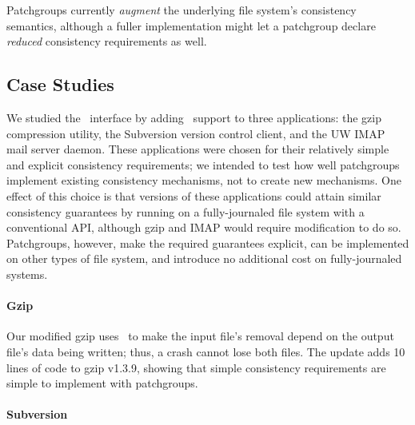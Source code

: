 Patchgroups currently \emph{augment} the underlying file system's
consistency semantics, although a fuller implementation might let a
patchgroup declare \emph{reduced} consistency requirements as well.

\subsection{Case Studies}
\label{sec:patchgroup:casestudies}


We studied the \patchgroup\ interface by adding \patchgroup\ support to three
applications: the gzip compression utility, the Subversion version control
client, and the UW IMAP mail server daemon.
%
These applications were chosen for their relatively simple and explicit
consistency requirements; we intended to test how well patchgroups
implement existing consistency mechanisms, not to create new mechanisms.
One effect of this choice is that versions of
these applications could attain similar consistency guarantees
by running on a
fully-journaled file system with a conventional API, although gzip and IMAP
would require modification to do so.  Patchgroups, however,
make the required guarantees explicit, can be implemented on other types of
file system, and introduce no additional cost on fully-journaled systems.


\paragraph{Gzip}
\label{sec:patchgroup:gzip}

Our modified gzip uses \patchgroups\ to make the input file's
removal depend on the output file's data being written; thus,
a crash cannot lose both files. The update adds 10 lines of code to gzip
v1.3.9, showing that simple consistency requirements are simple to
implement with patchgroups.

\paragraph{Subversion}
\label{sec:patchgroup:svn}

